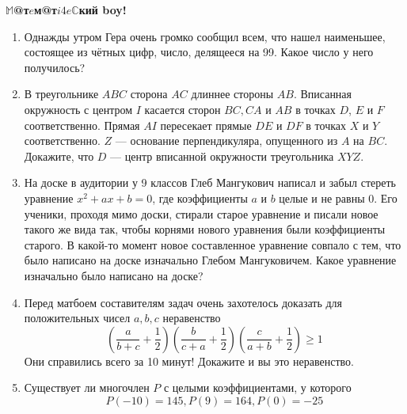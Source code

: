 \documentclass{article}
\begin{document}
    \large


    \begin{center}
        \textbf{$\mathbb{M}$@т$e$м@т$i4e\mathbb{C}$кий boy!}
    \end{center}

    \begin{enumerate}[label*=\arabic{enumi}.]

        \item Однажды утром Гера очень громко сообщил всем, что нашел наименьшее, состоящее из чётных цифр, число,
        делящееся на 99.
        Какое число у него получилось?

        \item В треугольнике $ABC$ сторона $AC$ длиннее стороны $AB$.
        Вписанная окружность с центром $I$ касается сторон $BC, CA$ и $AB$ в точках $D$, $E$ и $F$ соответственно.
        Прямая $AI$ пересекает прямые $DE$ и $DF$ в точках $X$ и $Y$ соответственно. $Z$ --- основание перпендикуляра, опущенного из $A$ на $BC$.
        Докажите, что $D$ --- центр вписанной окружности треугольника $XYZ$.

        \item На доске в аудитории у 9 классов Глеб Мангукович написал и забыл стереть уравнение
        $x^2 + ax + b = 0$, где коэффициенты $a$ и $b$ целые и не равны 0.
        Его ученики, проходя мимо доски, стирали старое уравнение и писали новое такого же вида так, чтобы корнями нового уравнения были коэффициенты старого.
        В какой-то момент новое составленное уравнение совпало с тем, что было написано на доске изначально Глебом Мангуковичем.
        Какое уравнение изначально было написано на доске?

        \item Перед матбоем составителям задач очень захотелось доказать для положительных чисел $a,b,c$ неравенство
        \[\left(\frac{a}{b+c} + \frac{1}{2}\right)\left(\frac{b}{c+a} + \frac{1}{2}\right)\left(\frac{c}{a+b} + \frac{1}{2}\right) \geqslant 1\]
        Они справились всего за 10 минут!
        Докажите и вы это неравенство.

        \item Существует ли многочлен $P$ с целыми коэффициентами, у которого \[P(-10) = 145, P(9) = 164,  P(0) = -25\]



\end{enumerate}
\end{document}
